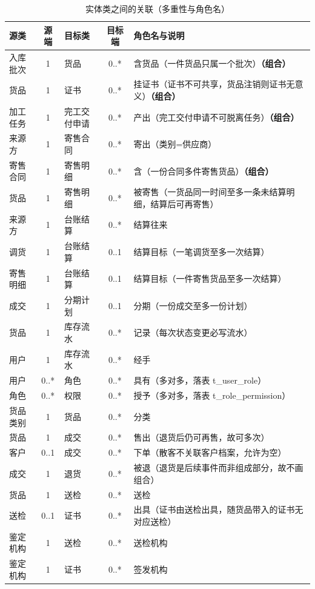 \begin{table}[H]
\centering
\small
\caption{实体类之间的关联（多重性与角色名）}
\label{tab:rels}
\begin{tabularx}{\textwidth}{@{}l c l c Y@{}}
\toprule
源类 & 源端 & 目标类 & 目标端 & 角色名与说明 \\
\midrule
入库批次 & 1 & 货品 & 0..* & 含货品（一件货品只属一个批次）\textbf{（组合）} \\
货品 & 1 & 证书 & 0..* & 挂证书（证书不可共享，货品注销则证书无意义）\textbf{（组合）} \\
加工任务 & 1 & 完工交付申请 & 0..* & 产出（完工交付申请不可脱离任务）\textbf{（组合）} \\
来源方 & 1 & 寄售合同 & 0..* & 寄出（类别=供应商） \\
寄售合同 & 1 & 寄售明细 & 0..* & 含（一份合同多件寄售货品）\textbf{（组合）} \\
货品 & 1 & 寄售明细 & 0..* & 被寄售（一货品同一时间至多一条未结算明细，结算后可再寄售） \\
来源方 & 1 & 台账结算 & 0..* & 结算往来 \\
调货 & 1 & 台账结算 & 0..1 & 结算目标（一笔调货至多一次结算） \\
寄售明细 & 1 & 台账结算 & 0..1 & 结算目标（一件寄售货品至多一次结算） \\
成交 & 1 & 分期计划 & 0..1 & 分期（一份成交至多一份计划） \\
货品 & 1 & 库存流水 & 0..* & 记录（每次状态变更必写流水） \\
用户 & 1 & 库存流水 & 0..* & 经手 \\
用户 & 0..* & 角色 & 0..* & 具有（多对多，落表 t\_user\_role） \\
角色 & 0..* & 权限 & 0..* & 授予（多对多，落表 t\_role\_permission） \\
货品类别 & 1 & 货品 & 0..* & 分类 \\
货品 & 1 & 成交 & 0..* & 售出（退货后仍可再售，故可多次） \\
客户 & 0..1 & 成交 & 0..* & 下单（散客不关联客户档案，允许为空） \\
成交 & 1 & 退货 & 0..* & 被退（退货是后续事件而非组成部分，故不画组合） \\
货品 & 1 & 送检 & 0..* & 送检 \\
送检 & 0..1 & 证书 & 0..* & 出具（证书由送检出具，随货品带入的证书无对应送检） \\
鉴定机构 & 1 & 送检 & 0..* & 送检机构 \\
鉴定机构 & 1 & 证书 & 0..* & 签发机构 \\

\end{tabularx}
\end{table}
